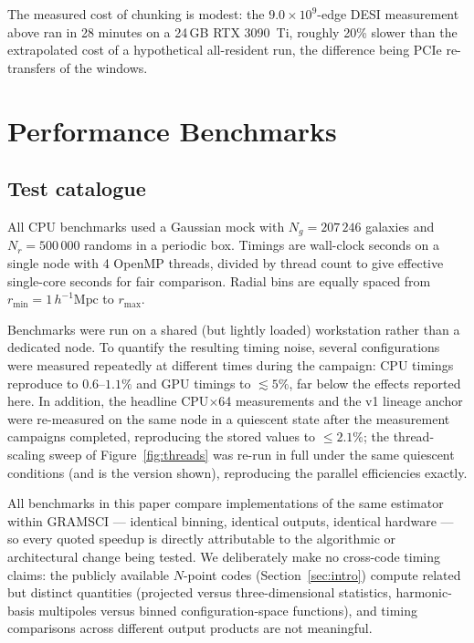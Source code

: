 \documentclass[twocolumn]{aastex701}
\newcommand{\rmax}{r_{\mathrm{max}}}
\newcommand{\Mpch}{\,h^{-1}\mathrm{Mpc}}
\begin{document}
The measured cost of chunking is modest: the $9.0\times10^9$-edge DESI
measurement above ran in 28 minutes on a 24\,GB RTX 3090~Ti, roughly 20\%
slower than the extrapolated cost of a hypothetical all-resident run, the
difference being PCIe re-transfers of the windows.

\section{Performance Benchmarks}
\label{sec:performance}

\subsection{Test catalogue}

All CPU benchmarks used a Gaussian mock with $N_g = 207\,246$ galaxies and
$N_r = 500\,000$ randoms in a periodic box.  Timings are wall-clock
seconds on a single node with 4 OpenMP threads, divided by thread count to
give effective single-core seconds for fair comparison.  Radial bins are
equally spaced from $r_\mathrm{min} = 1\Mpch$ to $\rmax$.

Benchmarks were run on a shared (but lightly loaded) workstation rather
than a dedicated node.  To quantify the resulting timing noise, several
configurations were measured repeatedly at different times during the
campaign: CPU timings reproduce to $0.6$--$1.1\%$ and GPU timings to
${\lesssim}5\%$, far below the effects reported here.  In addition, the
headline CPU$\times$64 measurements and the v1 lineage anchor were
re-measured on the same node in a quiescent state after the measurement
campaigns completed, reproducing the stored values to $\le 2.1\%$; the
thread-scaling sweep of Figure~\ref{fig:threads} was re-run in full
under the same quiescent conditions (and is the version shown),
reproducing the parallel efficiencies exactly.

All benchmarks in this paper compare implementations of the same estimator
within GRAMSCI --- identical binning, identical outputs, identical hardware
--- so every quoted speedup is directly attributable to the algorithmic or
architectural change being tested.  We deliberately make no cross-code
timing claims: the publicly available $N$-point codes
(Section~\ref{sec:intro}) compute related but distinct quantities
(projected versus three-dimensional statistics, harmonic-basis multipoles
versus binned configuration-space functions), and timing comparisons
across different output products are not meaningful.
\end{document}
